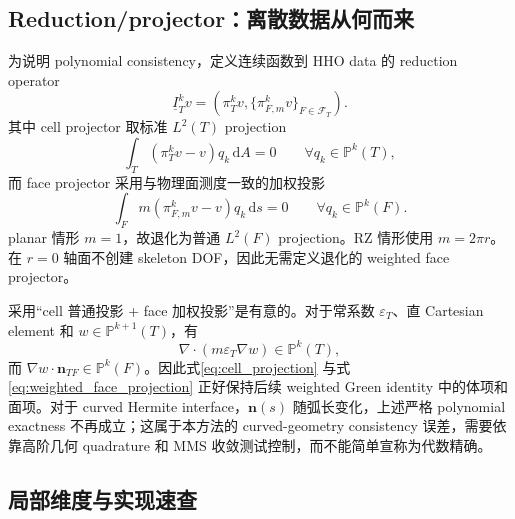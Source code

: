 \documentclass[UTF8,a4paper,11pt]{ctexart}
\newcommand{\Pp}{\mathbb{P}}
\newcommand{\dd}{\mathrm{d}}
\newcommand{\eps}{\varepsilon}
\newcommand{\vct}[1]{\bm{#1}}
\begin{document}
\subsection{Reduction/projector：离散数据从何而来}

为说明 polynomial consistency，定义连续函数到 HHO data 的 reduction operator
\begin{equation}
\underline I_T^k v
=
\left(\pi_T^k v,\{\pi_{F,m}^k v\}_{F\in\mathcal F_T}\right).
\label{eq:reduction_operator}
\end{equation}
其中 cell projector 取标准 \(L^2(T)\) projection
\begin{equation}
\int_T\left(\pi_T^k v-v\right)q_k\,\dd A=0
\qquad\forall q_k\in\Pp^k(T),
\label{eq:cell_projection}
\end{equation}
而 face projector 采用与物理面测度一致的加权投影
\begin{equation}
\boxed{
\int_Fm\left(\pi_{F,m}^k v-v\right)q_k\,\dd s=0
\qquad\forall q_k\in\Pp^k(F).
}
\label{eq:weighted_face_projection}
\end{equation}
planar 情形 \(m=1\)，故退化为普通 \(L^2(F)\) projection。RZ 情形使用 \(m=2\pi r\)。在 \(r=0\) 轴面不创建 skeleton DOF，因此无需定义退化的 weighted face projector。

采用“cell 普通投影 + face 加权投影”是有意的。对于常系数 \(\eps_T\)、直 Cartesian element 和 \(w\in\Pp^{k+1}(T)\)，有
\[
\nabla\cdot(m\eps_T\nabla w)\in\Pp^k(T),
\]
而 \(\nabla w\cdot\vct n_{TF}\in\Pp^k(F)\)。因此式\eqref{eq:cell_projection} 与式\eqref{eq:weighted_face_projection} 正好保持后续 weighted Green identity 中的体项和面项。对于 curved Hermite interface，\(\vct n(s)\) 随弧长变化，上述严格 polynomial exactness 不再成立；这属于本方法的 curved-geometry consistency 误差，需要依靠高阶几何 quadrature 和 MMS 收敛测试控制，而不能简单宣称为代数精确。

\subsection{局部维度与实现速查}
\end{document}
